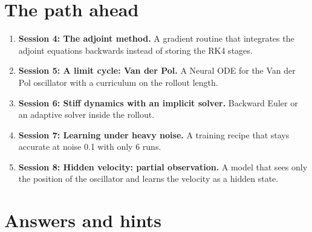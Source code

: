 \documentclass[11pt,a4paper]{article}
\begin{document}
\section{The path ahead}
\begin{enumerate}[nosep]
\item \textbf{Session 4: The adjoint method.} A gradient routine that integrates the adjoint equations backwards instead of storing the RK4 stages.
\item \textbf{Session 5: A limit cycle: Van der Pol.} A Neural ODE for the Van der Pol oscillator with a curriculum on the rollout length.
\item \textbf{Session 6: Stiff dynamics with an implicit solver.} Backward Euler or an adaptive solver inside the rollout.
\item \textbf{Session 7: Learning under heavy noise.} A training recipe that stays accurate at noise 0.1 with only 6 runs.
\item \textbf{Session 8: Hidden velocity: partial observation.} A model that sees only the position of the oscillator and learns the velocity as a hidden state.
\end{enumerate}

\section{Answers and hints}
\end{document}
